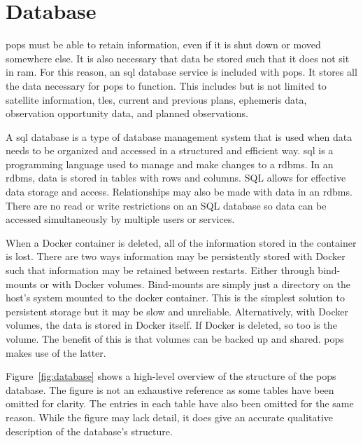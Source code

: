 
\section{Database}\label{sec:database}

\gls{pops} must be able to retain information, even if it is
shut down or moved somewhere else. It is also necessary that data be stored
such that it does not sit in \gls{ram}. For this reason, an \acrshort{sql}
database service is included with \gls{pops}. It stores all the data necessary
for \gls{pops} to function. This includes but is not limited to satellite
information, \glspl{tle}, current and previous plans, ephemeris data,
observation opportunity data, and planned observations. 

A \gls{sql} database is a type of database management system that is used when
data needs to be organized and accessed in a structured and efficient way.
\gls{sql} is a programming language used to manage and make changes to a
\gls{rdbms}. In an \gls{rdbms}, data is stored in tables with rows and columns.
SQL allows for effective data storage and access. Relationships may also be
made with data in an \gls{rdbms}. There are no read or write restrictions on an
SQL database so data can be accessed simultaneously by multiple users or
services.

When a Docker container is deleted, all of the information stored in the
container is lost.  There are two ways information may be persistently stored
with Docker such that information may be retained between restarts. Either
through bind-mounts or with Docker volumes.  Bind-mounts are simply just a
directory on the host's system mounted to the docker container. This is the
simplest solution to persistent storage but it may be slow and unreliable.
Alternatively, with Docker volumes, the data is stored in Docker itself. If
Docker is deleted, so too is the volume. The benefit of this is that volumes
can be backed up and shared. \gls{pops} makes use of the latter.

Figure~\ref{fig:database} shows a high-level overview of the structure of the
\gls{pops} database. The figure is not an exhaustive reference as some tables
have been omitted for clarity. The entries in each table have also been
omitted for the same reason. While the figure may lack detail, it does give an
accurate qualitative description of the database's structure. 


